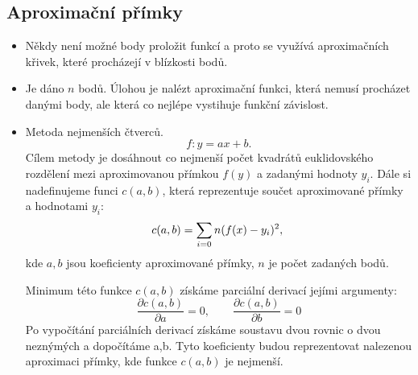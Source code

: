 \subsection{Aproximační přímky}
\begin{itemize}
\item Někdy není možné body proložit funkcí a proto se využívá aproximačních křivek, které procházejí v blízkosti bodů.
\item Je dáno $n$ bodů. Úlohou je nalézt aproximační funkci, která nemusí procházet danými body, ale která co nejlépe vystihuje funkční závislost. 
\item Metoda nejmenších čtverců. 
			\begin{equation}
			\label{rovnicePrimky} 
			  f: y = ax + b.
			\end{equation}
			Cílem metody je dosáhnout co nejmenší počet kvadrátů euklidovského rozdělení mezi aproximovanou přímkou $f(y)$ a zadanými hodnoty $y_{i}$. Dále si nadefinujeme funci $c(a,b)$, která reprezentuje součet aproximované přímky a hodnotami $y_{i}$:
			\begin{equation}  
			\label{soucetPrimky}
			  c(a,b) = \sum_{i=0}{n} (f(x) - y_{i})^2, \\
			\end{equation}
			kde $a, b$ jsou koeficienty aproximované přímky, $n$ je počet zadaných bodů. 

			Minimum této funkce $c(a,b)$ získáme parciální derivací jejími argumenty:
			\begin{equation}  
			\label{parcialDerivation}
			  \frac{\partial c(a,b)}{\partial a} = 0,  \quad \quad  \frac{\partial c(a,b)}{\partial b} = 0
			\end{equation}
			Po vypočítání parciálních derivací získáme soustavu dvou rovnic o dvou neznýmých a dopočítáme a,b. Tyto koeficienty budou reprezentovat nalezenou aproximaci přímky, kde funkce $c(a,b)$ je nejmenší.

\end{itemize}

